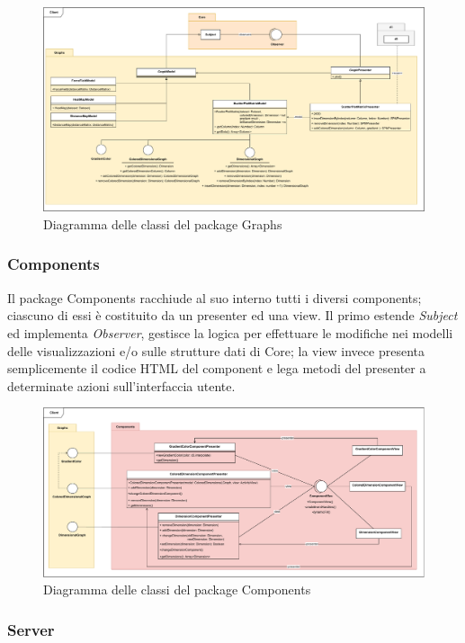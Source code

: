 \documentclass[../manuale_sviluppatore.tex]{subfiles}
\begin{document}
\begin{figure}[H]
	\centering
	\includegraphics[width=18cm]{src/img/graphs.pdf}
	\caption{Diagramma delle classi del package Graphs}
\end{figure}


\subsubsection*{Components}

Il package Components racchiude al suo interno tutti i diversi components; ciascuno di essi è 
costituito da un presenter ed una view. Il primo estende \emph{Subject} ed implementa 
\emph{Observer}, gestisce la logica per effettuare le modifiche nei modelli delle visualizzazioni e/o 
sulle strutture dati di Core; la view invece presenta semplicemente il codice HTML del component e 
lega metodi del presenter a determinate azioni sull'interfaccia utente.

\begin{figure}[H]
	\centering
	\includegraphics[width=18cm]{src/img/components.pdf}
	\caption{Diagramma delle classi del package Components}
\end{figure}

\subsubsection{Server}
\label{ssub:server}
\end{document}
